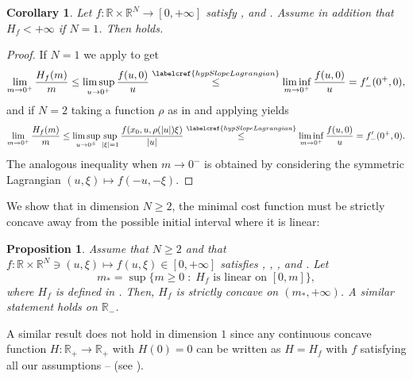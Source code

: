 \documentclass[10pt]{amsart}
\theoremstyle{plain}
\newtheorem{proposition}[theorem]{Proposition}
\newtheorem{corollary}[theorem]{Corollary}
\theoremstyle{definition}
\newcommand{\R}{\mathbb{R}}
\newcommand{\st}{\;:\;}
\DeclarePairedDelimiter{\abs}{\lvert}{\rvert}
\begin{document}
\begin{corollary}\label{slopeConditionCorollary}
Let $f : \R \times \R^N \to [0,+\infty]$ satisfy ,  and . Assume in addition that $H_f<+\infty$ if $N=1$. Then  holds.
\end{corollary}
\begin{proof}
If $N=1$ we apply  to get
\[\lim_{m\to 0^+} \frac{H_f(m)} m \leq \limsup_{u\to 0^+} \frac{f(u,0)}u \overset{\labelcref{hypSlopeLagrangian}}{\leq} \liminf_{m\to 0^+} \frac{f(u,0)}u = f'_-(0^+,0),\]
and if $N=2$ taking a function $\rho$ as in  and applying  yields
\[\lim_{m\to 0^+} \frac{H_f(m)} m \leq \limsup_{u\to 0^\pm}\sup_{\abs{\xi}= 1}\frac{f(x_0,u,\rho(\abs{u})\xi)}{\abs{u}} \overset{\labelcref{hypSlopeLagrangian}}{\leq} \liminf_{m\to 0^+} \frac{f(u,0)}u = f'_-(0^+,0).\]
The analogous inequality when $m\to 0^-$ is obtained by considering the symmetric Lagrangian $(u,\xi) \mapsto f(-u,-\xi)$.
\end{proof}


We show that in dimension \(N\geq 2\), the minimal cost function must be strictly concave away from the possible initial interval where it is linear:
\begin{proposition}\label{propositionStricConcave}
Assume that \(N\geq 2\) and that $f :\R\times\R^N\ni (u,\xi) \mapsto f(u,\xi)\in [0,+\infty]$ satisfies , , ,  and . Let
\[
m_\ast=\sup\{m\geq 0\st \text{\(H_f\) is linear on \([0,m]\)}\},
\]
where \(H_f\) is defined in . Then, \(H_f\) is strictly concave on \((m_\ast,+\infty)\). A similar statement holds on $\R_-$.
\end{proposition}
A similar result does not hold in dimension \(1\) since any continuous concave function \(H:\R_+\to\R_+\) with \(H(0)=0\) can be written as \(H=H_f\) with \(f\) satisfying all our assumptions -- (see ).
\end{document}
